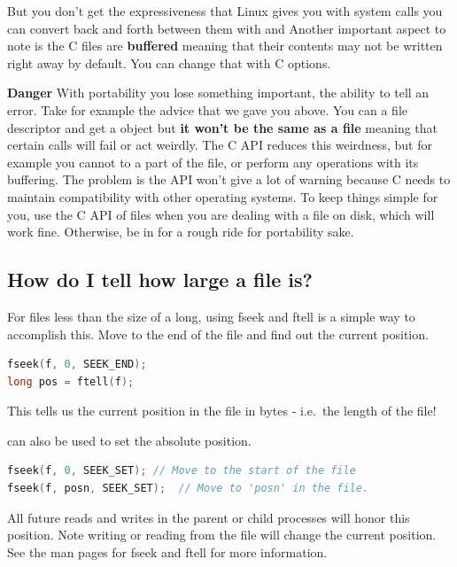 But you don't get the expressiveness that Linux gives you with system calls you can convert back and forth between them with  and  Another important aspect to note is the C files are \textbf{buffered} meaning that their contents may not be written right away by default. You can change that with C options.

\textbf{Danger} With portability you lose something important, the ability to tell an error. Take for example the advice that we gave you above. You can  a file descriptor and get a  object but \textbf{it won't be the same as a file} meaning that certain calls will fail or act weirdly.
The C API reduces this weirdness, but for example you cannot  to a part of the file, or perform any operations with its buffering.
The problem is the API won't give a lot of warning because C needs to maintain compatibility with other operating systems.
To keep things simple for you, use the C API of files when you are dealing with a file on disk, which will work fine. Otherwise, be in for a rough ride for portability sake.

\subsection{How do I tell how large a file is?}

For files less than the size of a long, using fseek and ftell is a
simple way to accomplish this.
Move to the end of the file and find out the current position.

\begin{lstlisting}[language=C]
fseek(f, 0, SEEK_END);
long pos = ftell(f);
\end{lstlisting}

This tells us the current position in the file in bytes - i.e.~the
length of the file!

 can also be used to set the absolute position.

\begin{lstlisting}[language=C]
fseek(f, 0, SEEK_SET); // Move to the start of the file
fseek(f, posn, SEEK_SET);  // Move to 'posn' in the file.
\end{lstlisting}

All future reads and writes in the parent or child processes will honor this position.
Note writing or reading from the file will change the current position.
See the man pages for fseek and ftell for more information.

